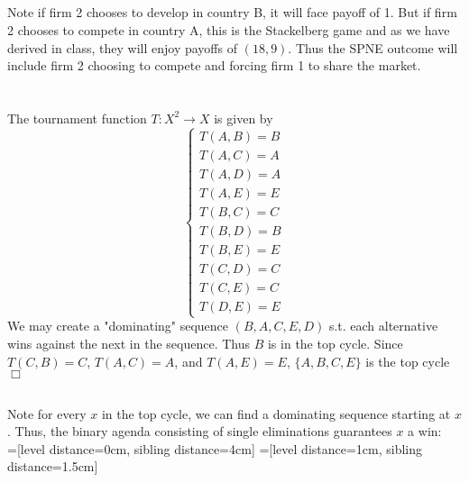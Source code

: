 \documentclass{article}
\begin{document}
\subsection{}
Note if firm 2 chooses to develop in country B, it will face payoff of 1. But if firm 2 chooses to compete in country A, this is the Stackelberg game and as we have derived in class, they will enjoy payoffs of $(18,9)$. Thus the SPNE outcome will include firm 2 choosing to compete and forcing firm 1 to share the market.

\section{}
\subsection{}
The tournament function $T: X^2 \rightarrow X$ is given by
\begin{equation*}
    \begin{cases}
    T(A,B) = B\\
    T(A,C) = A\\
    T(A,D) = A\\
    T(A,E) = E\\
    T(B,C) = C\\
    T(B,D) = B\\
    T(B,E) = E\\
    T(C,D) = C\\
    T(C,E) = C\\
    T(D,E) = E
    \end{cases}
\end{equation*}
We may create a "dominating" sequence $(B,A,C,E,D)$ s.t. each alternative wins against the next in the sequence. Thus $B$ is in the top cycle. Since $T(C,B) = C$, $T(A,C) = A$, and $T(A,E) = E$, $\{A,B,C,E\}$ is the top cycle $\Box$

\subsection{}
Note for every $x$ in the top cycle, we can find a dominating sequence starting at $x$. Thus, the binary agenda consisting of single eliminations guarantees $x$ a win:\\

=[level distance=0cm, sibling distance=4cm]
=[level distance=1cm, sibling distance=1.5cm]
\end{document}
